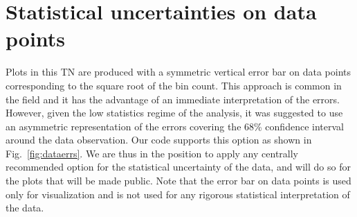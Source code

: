 \section{Statistical uncertainties on data points}

Plots in this TN are produced with a symmetric vertical error bar on data points corresponding to the square root of the bin count. This approach is common in the field and it has the advantage of an immediate interpretation of the errors. However, given the low statistics regime of the analysis, it was suggested to use an asymmetric representation of the errors covering the 68\% confidence interval around the data observation. Our code supports this option as shown in Fig.~\ref{fig:dataerrs}. We are thus in the position to apply any centrally recommended option for the statistical uncertainty of the data, and will do so for the plots that will be made public. Note that the error bar on data points is used only for visualization and is not used for any rigorous statistical interpretation of the data.

